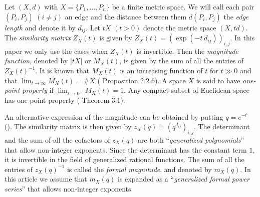 Let $(X,d)$ with $X=\{P_1,\dots,P_n\}$ be a finite metric space. We will call each pair $(P_i,P_j)$ $(i\ne j)$ an edge and the distance between them $d(P_i,P_j)$ the {\em edge length} and denote it by $d_{ij}$. 
Let $tX$ $(t>0)$ denote the metric space $(X,td)$. 
The {\em similarity matrix} $Z_X(t)$ is given by $Z_X(t)=\left(\exp(-t\, d_{ij})\right)_{i,j}$. %
In this paper we only use the cases when $Z_X(t)$ is invertible. 
Then the {\em magnitude function}, denoted by $|tX|$ or $M_X(t)$, is given by the sum of all the entries of $Z_X(t)^{-1}$. 
It is known that $M_X(t)$ is an increasing function of $t$ for $t\gg0$ and that $\lim_{t\to\infty}M_X(t)=\#X$ (\cite{L13} Proposition 2.2.6). 
A space $X$ is said to have {\em one-point property} if $\lim_{t\to0^+}M_X(t)=1$. 
Any compact subset of Euclidean space has one-point property (\cite{LM23} Theorem 3.1). 

An alternative expression of the magnitude can be obtained by putting $q=e^{-t}$ (\cite{L19}). The similarity matrix is then given by $z_X(q)=\left(q^{d_{ij}}\right)_{i,j}$. 
The determinant and the sum of all the cofactors of $z_X(q)$ are both ``{\em generalized polynomials}'' that allow non-integer exponents. 
Since the determinant has the constant term $1$, it is invertible in the field of generalized rational functions. The sum of all the entries of $z_X(q)^{-1}$ is called the {\em formal magnitude}, and denoted by $m_X(q)$. 
In this article we assume that $m_X(q)$ is expanded as a ``{\em generalized formal power series}'' that allows non-integer exponents. 
